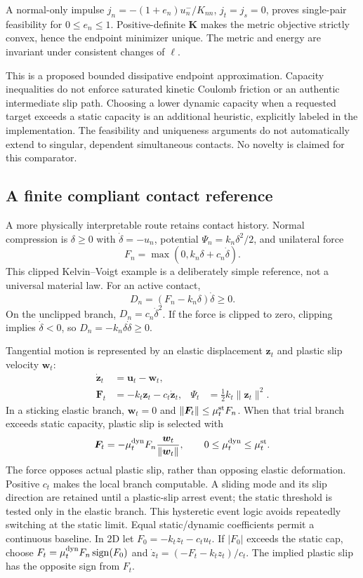 \documentclass[11pt,a4paper]{article}
\newcommand{\bv}[1]{\bm{#1}}\newcommand{\inertia}{\mathbb I}
\begin{document}
A normal-only impulse $j_n=-(1+e_n)u_n^-/K_{nn}$, $j_t=j_s=0$, proves single-pair feasibility for $0\leq e_n\leq1$. Positive-definite $\bv K$ makes the metric objective strictly convex, hence the endpoint minimizer unique. The metric and energy are invariant under consistent changes of $\ell$.

This is a proposed bounded dissipative endpoint approximation. Capacity inequalities do not enforce saturated kinetic Coulomb friction or an authentic intermediate slip path. Choosing a lower dynamic capacity when a requested target exceeds a static capacity is an additional heuristic, explicitly labeled in the implementation. The feasibility and uniqueness arguments do not automatically extend to singular, dependent simultaneous contacts. No novelty is claimed for this comparator.

\subsection{A finite compliant contact reference}
A more physically interpretable route retains contact history. Normal compression is $\delta\geq0$ with $\dot\delta=-u_n$, potential $\Psi_n=k_n\delta^2/2$, and unilateral force
\begin{equation}
F_n=\max(0,k_n\delta+c_n\dot\delta).
\end{equation}
This clipped Kelvin--Voigt example is a deliberately simple reference, not a universal material law. For an active contact,
\begin{equation}
D_n=(F_n-k_n\delta)\dot\delta\geq0.
\end{equation}
On the unclipped branch, $D_n=c_n\dot\delta^2$. If the force is clipped to zero, clipping implies $\dot\delta<0$, so $D_n=-k_n\delta\dot\delta\geq0$.

Tangential motion is represented by an elastic displacement $\bv z_t$ and plastic slip velocity $\bv w_t$:
\begin{align}
\dot{\bv z}_t&=\bv u_t-\bv w_t,\\
\bv F_t&=-k_t\bv z_t-c_t\dot{\bv z}_t,
&\Psi_t&=\tfrac12k_t\|\bv z_t\|^2.
\end{align}
In a sticking elastic branch, $\bv w_t=0$ and $\|\bv F_t\|\leq\mu_t^{\rm st}F_n$. When that trial branch exceeds static capacity, plastic slip is selected with
\begin{equation}
\bv F_t=-\mu_t^{\rm dyn}F_n\frac{\bv w_t}{\|\bv w_t\|},
\qquad 0\leq\mu_t^{\rm dyn}\leq\mu_t^{\rm st}.
\end{equation}
The force opposes actual plastic slip, rather than opposing elastic deformation. Positive $c_t$ makes the local branch computable. A sliding mode and its slip direction are retained until a plastic-slip arrest event; the static threshold is tested only in the elastic branch. This hysteretic event logic avoids repeatedly switching at the static limit. Equal static/dynamic coefficients permit a continuous baseline. In 2D let $F_0=-k_tz_t-c_tu_t$. If $|F_0|$ exceeds the static cap, choose $F_t=\mu_t^{\rm dyn}F_n\operatorname{sign}(F_0)$ and $\dot z_t=(-F_t-k_tz_t)/c_t$. The implied plastic slip has the opposite sign from $F_t$.
\end{document}
